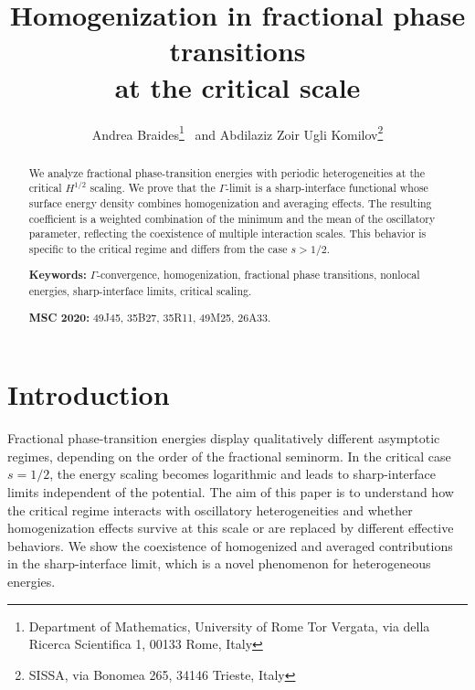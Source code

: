 \documentclass[12pt]{article}
\numberwithin{equation}{section}
\begin{document}
\author{Andrea Braides\footnote{Department of Mathematics, University of Rome Tor Vergata, via della Ricerca Scientifica 1, 00133 Rome, Italy} \ and Abdilaziz Zoir Ugli Komilov\footnote{SISSA, via Bonomea 265, 34146 Trieste, Italy}}
\title{Homogenization in fractional phase transitions 
\\ at the critical scale}
\date{}
\def\epsilon{\varepsilon}
\maketitle

\begin{abstract}
We analyze fractional phase-transition energies with periodic hetero\-genei\-ties at the critical $H^{1/2}$
 scaling. We prove that the $\Gamma$-limit is a sharp-interface functional whose surface energy density combines homogenization and averaging effects. The resulting coefficient is a weighted combination of the minimum and the mean of the oscillatory parameter, reflecting the coexistence of multiple interaction scales. This behavior is specific to the critical regime and differs from the case $s>1/2$.

 {\bf Keywords:} $\Gamma$-convergence, homogenization, fractional phase transitions, nonlocal energies, sharp-interface limits, critical scaling.
 
 {\bf MSC 2020:} 49J45, 35B27, 35R11, 49M25, 26A33.
 
 \end{abstract}
\section{Introduction}
Fractional phase-transition energies display qualitatively different asymptotic regimes, depending on the order of the fractional seminorm. In the critical case $s=1/2$, the energy scaling becomes logarithmic and leads to sharp-interface limits independent of the potential.
The aim of this paper is to understand how the critical regime interacts with oscillatory heterogeneities and whether homogenization effects survive at this scale or are replaced by different effective behaviors.
We show the coexistence of homogenized and averaged contributions in the sharp-interface limit, which is a novel phenomenon for heterogeneous energies.
\end{document}
